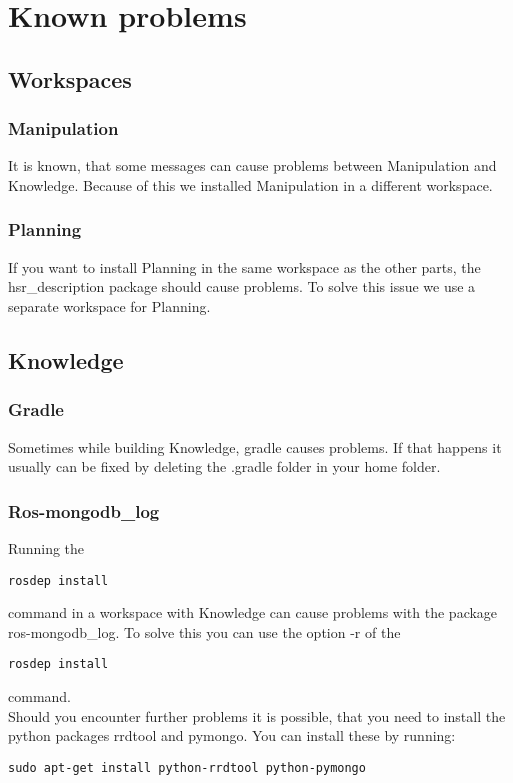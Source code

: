 \documentclass[main.tex]{subfiles}
\begin{document}
	\section{Known problems}

	\subsection{Workspaces}
	\subsubsection{Manipulation}
	It is known, that some messages can cause problems between Manipulation and Knowledge. Because of this we installed Manipulation in a different workspace.
	
	\subsubsection{Planning}
	If you want to install Planning in the same workspace as the other parts, the hsr\_description package should cause problems. To solve this issue we use a separate workspace for Planning.
	

	\subsection{Knowledge}
	\subsubsection{Gradle}
	Sometimes while building Knowledge, gradle causes problems.
	If that happens it usually can be fixed by deleting the .gradle folder in your home folder.
	
	\subsubsection{Ros-mongodb\_log}
	Running the \\
	\begin{lstlisting}
rosdep install
\end{lstlisting}
command in a workspace with Knowledge can cause problems with the package ros-mongodb\_log. To solve this you can use the option -r of the \\
\begin{lstlisting}
rosdep install
\end{lstlisting}
command.\\
Should you encounter further problems it is possible, that you need to install the  python packages rrdtool and pymongo. You can install these by running:\\
\begin{lstlisting}
sudo apt-get install python-rrdtool python-pymongo
\end{lstlisting}
\end{document}
